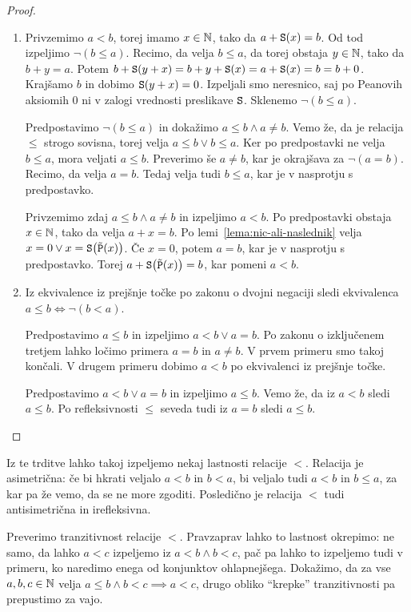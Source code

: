\begin{proof}
\begin{enumerate}
\item
Privzemimo $a < b$, torej imamo $x \in \mathbb{N}$, tako da $a + \mathtt{S}(x) = b$. Od tod izpeljimo $\lnot(b \leq a)$. Recimo, da velja $b \leq a$, da torej obstaja $y \in \mathbb{N}$, tako da $b + y = a$. Potem $b + \mathtt{S}(y + x) = b + y + \mathtt{S}(x) = a + \mathtt{S}(x) = b = b + 0$. Krajšamo $b$ in dobimo $\mathtt{S}(y + x) = 0$. Izpeljali smo neresnico, saj po Peanovih aksiomih $0$ ni v zalogi vrednosti preslikave $\mathtt{S}$. Sklenemo $\lnot(b \leq a)$.

Predpostavimo $\lnot(b \leq a)$ in dokažimo $a \leq b \land a \neq b$. Vemo že, da je relacija $\leq$ strogo sovisna, torej velja $a \leq b \lor b \leq a$. Ker po predpostavki ne velja $b \leq a$, mora veljati $a \leq b$. Preverimo še $a \neq b$, kar je okrajšava za $\lnot(a = b)$. Recimo, da velja $a = b$. Tedaj velja tudi $b \leq a$, kar je v nasprotju s predpostavko.

Privzemimo zdaj $a \leq b \land a \neq b$ in izpeljimo $a < b$. Po predpostavki obstaja $x \in \mathbb{N}$, tako da velja $a + x = b$. Po lemi~\ref{lema:nic-ali-naslednik} velja $x = 0 \lor x = \mathtt{S}\big(\tilde{\mathtt{P}}(x)\big)$. Če $x = 0$, potem $a = b$, kar je v nasprotju s predpostavko. Torej $a + \mathtt{S}\big(\tilde{\mathtt{P}}(x)\big) = b$, kar pomeni $a < b$.
\item
Iz ekvivalence iz prejšnje točke po zakonu o dvojni negaciji sledi ekvivalenca $a \leq b \iff \lnot(b < a)$.

Predpostavimo $a \leq b$ in izpeljimo $a < b \lor a = b$. Po zakonu o izključenem tretjem lahko ločimo primera $a = b$ in $a \neq b$. V prvem primeru smo takoj končali. V drugem primeru dobimo $a < b$ po ekvivalenci iz prejšnje točke.

Predpostavimo $a < b \lor a = b$ in izpeljimo $a \leq b$. Vemo že, da iz $a < b$ sledi $a \leq b$. Po refleksivnosti $\leq$ seveda tudi iz $a = b$ sledi $a \leq b$.
\end{enumerate}
\end{proof}

Iz te trditve lahko takoj izpeljemo nekaj lastnosti relacije $<$. Relacija je asimetrična: če bi hkrati veljalo $a < b$ in $b < a$, bi veljalo tudi $a < b$ in $b \leq a$, za kar pa že vemo, da se ne more zgoditi. Posledično je relacija $<$ tudi antisimetrična in irefleksivna. 

Preverimo tranzitivnost relacije $<$. Pravzaprav lahko to lastnost okrepimo: ne samo, da lahko $a < c$ izpeljemo iz $a < b \land b < c$, pač pa lahko to izpeljemo tudi v primeru, ko naredimo enega od konjunktov ohlapnejšega. Dokažimo, da za vse $a, b, c \in \mathbb{N}$ velja $a \leq b \land b < c \implies a < c$, drugo obliko ``krepke'' tranzitivnosti pa prepustimo za vajo.


